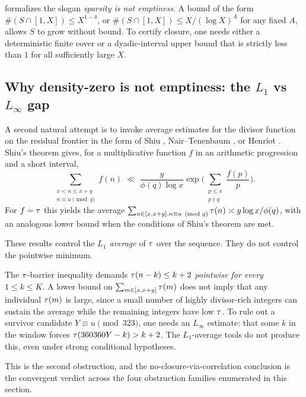  formalizes the slogan
\emph{sparsity is not emptiness}. A bound of the form
$\#(S \cap [1, X]) \le X^{1 - \delta}$, or
$\#(S \cap [1, X]) \le X / (\log X)^A$ for any fixed $A$, allows
$S$ to grow without bound. To certify closure, one needs either a
deterministic finite cover or a dyadic-interval upper bound that is
strictly less than $1$ for all sufficiently large $X$.

\subsection{Why density-zero is not emptiness: the \texorpdfstring{$L_1$ vs $L_\infty$}{L1 vs Linfty} gap}
\label{sec:L1-Linf}

A second natural attempt is to invoke average estimates for the
divisor function on the residual frontier in the form of Shiu
\cite{Shiu1980}, Nair--Tenenbaum \cite{NairTenenbaum1998}, or
Henriot \cite{Henriot2012}. Shiu's theorem gives, for a multiplicative
function $f$ in an arithmetic progression and a short interval,
\[
\sum_{\substack{x < n \le x + y \\ n \equiv a \pmod q}} f(n)
\;\ll\; \frac{y}{\phi(q) \log x}
\exp \biggl( \sum_{\substack{p \le x \\ p \nmid q}} \frac{f(p)}{p} \biggr) .
\]
For $f = \tau$ this yields the average $\sum_{n \in [x, x+y], n \equiv a \pmod q} \tau(n) \asymp y \log x / \phi(q)$, with an analogous lower bound when the conditions of Shiu's theorem are met.

These results control the \emph{$L_1$ average} of $\tau$ over the
sequence. They do not control the pointwise minimum.

\begin{remark}
The $\tau$-barrier inequality demands
$\tau(n - k) \le k + 2$ \emph{pointwise for every $1 \le k \le K$}.
A lower bound on $\sum_{m \in [x, x+y]} \tau(m)$ does not imply
that any individual $\tau(m)$ is large, since a small number of
highly divisor-rich integers can sustain the average while the
remaining integers have low $\tau$. To rule out a survivor
candidate $Y \equiv u \pmod{323}$, one needs an $L_\infty$
estimate: that some $k$ in the window forces $\tau(360360 Y - k) > k+2$.
The $L_1$-average tools do not produce this, even under strong
conditional hypotheses.
\end{remark}

This is the second obstruction, and the no-closure-via-correlation
conclusion is the convergent verdict across the four obstruction
families enumerated in this section.

